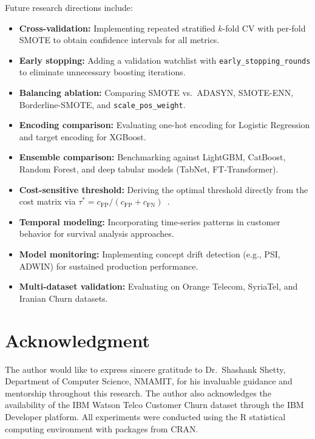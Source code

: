 \documentclass[10pt, conference, letterpaper]{IEEEtran}
\begin{document}
Future research directions include:
\begin{itemize}
    \item \textbf{Cross-validation:} Implementing repeated stratified $k$-fold CV with per-fold SMOTE to obtain confidence intervals for all metrics.
    \item \textbf{Early stopping:} Adding a validation watchlist with \texttt{early\_stopping\_rounds} to eliminate unnecessary boosting iterations.
    \item \textbf{Balancing ablation:} Comparing SMOTE vs.\ ADASYN, SMOTE-ENN, Borderline-SMOTE, and \texttt{scale\_pos\_weight}.
    \item \textbf{Encoding comparison:} Evaluating one-hot encoding for Logistic Regression and target encoding for XGBoost.
    \item \textbf{Ensemble comparison:} Benchmarking against LightGBM, CatBoost, Random Forest, and deep tabular models (TabNet, FT-Transformer).
    \item \textbf{Cost-sensitive threshold:} Deriving the optimal threshold directly from the cost matrix via $\tau^* = c_{\text{FP}} / (c_{\text{FP}} + c_{\text{FN}})$~\cite{elkan2001cost}.
    \item \textbf{Temporal modeling:} Incorporating time-series patterns in customer behavior for survival analysis approaches.
    \item \textbf{Model monitoring:} Implementing concept drift detection (e.g., PSI, ADWIN) for sustained production performance.
    \item \textbf{Multi-dataset validation:} Evaluating on Orange Telecom, SyriaTel, and Iranian Churn datasets.
\end{itemize}

\section*{Acknowledgment}
The author would like to express sincere gratitude to Dr.~Shashank Shetty, Department of Computer Science, NMAMIT, for his invaluable guidance and mentorship throughout this research. The author also acknowledges the availability of the IBM Watson Telco Customer Churn dataset through the IBM Developer platform. All experiments were conducted using the R statistical computing environment with packages from CRAN.
\end{document}
